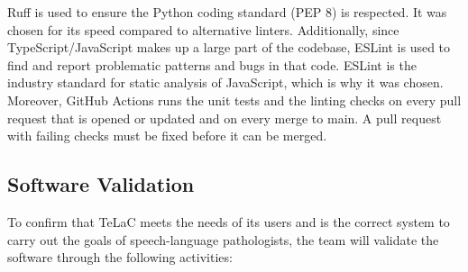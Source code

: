 \documentclass[12pt, titlepage]{article}
\renewcommand{\_}{\oldunderscore\allowbreak}
\begin{document}
Ruff is used to ensure the Python coding standard (PEP 8) is respected. 
It was chosen for its speed compared to alternative linters. 
Additionally, since TypeScript/JavaScript makes up a large part of the codebase, ESLint is used to find and report problematic patterns and bugs in that code. 
ESLint is the industry standard for static analysis of JavaScript, which is why it was chosen. 
Moreover, GitHub Actions runs the unit tests and the linting checks on every pull request that is opened or updated and on every merge to main. 
A pull request with failing checks must be fixed before it can be merged.


\subsection{Software Validation}
To confirm that TeLaC meets the needs of its users and is the correct system
to carry out the goals of speech-language pathologists, the team will validate
the software through the following activities:
\end{document}
